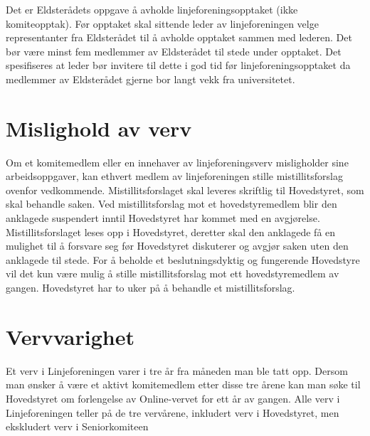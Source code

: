  {
Det er Eldsterådets oppgave å avholde linjeforeningsopptaket (ikke komiteopptak). Før opptaket skal
sittende leder av linjeforeningen \linebreak velge representanter fra Eldsterådet til å avholde opptaket sammen med lederen. Det bør være minst fem medlemmer av Eldsterådet til stede \linebreak under opptaket. Det spesifiseres at leder bør invitere til dette i god tid før linjeforeningsopptaket da medlemmer av Eldsterådet gjerne bor langt vekk fra universitetet.
}

\section{Mislighold av verv}
Om et komitemedlem eller en innehaver av linjeforeningsverv misligholder sine arbeidsoppgaver, kan ethvert medlem av linjeforeningen stille mistillitsforslag ovenfor vedkommende. Mistillitsforslaget skal leveres skriftlig til Hovedstyret, som skal behandle saken. Ved mistillitsforslag mot et hovedstyremedlem blir den anklagede suspendert inntil Hovedstyret har kommet med en avgjørelse. Mistillitsforslaget leses opp i Hovedstyret, deretter skal den anklagede få en mulighet til å forsvare seg før Hovedstyret diskuterer og avgjør saken uten den anklagede til stede. For å beholde et beslutningsdyktig og fungerende Hovedstyre vil det kun være mulig å stille mistillitsforslag mot ett hovedstyremedlem av gangen. Hovedstyret har to uker på å behandle et mistillitsforslag.


\section{Vervvarighet}
Et verv i Linjeforeningen varer i tre år fra måneden man ble tatt opp. Dersom man ønsker å være et aktivt komitemedlem etter disse tre årene kan man søke til Hovedstyret om forlengelse av Online-vervet for ett år av gangen. Alle verv i Linjeforeningen teller på de tre vervårene, inkludert verv i Hovedstyret, men ekskludert verv i Seniorkomiteen

\newpage